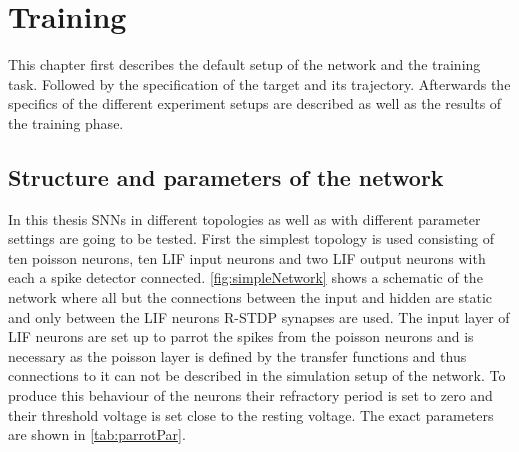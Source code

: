 
\chapter{Training}\label{chapter:Training}
This chapter first describes the default setup of the network and the training task. Followed by the specification of the target and its trajectory. Afterwards the specifics of the different experiment setups are described as well as the results of the training phase.
\section{Structure and parameters of the network}
In this thesis SNNs in different topologies as well as with different parameter settings are going to be tested. First the simplest topology is used consisting of ten poisson neurons, ten LIF input neurons and two LIF output neurons with each a spike detector connected. \autoref{fig:simpleNetwork} shows a schematic of the network where all but the connections between the input and hidden are static and only between the LIF neurons R-STDP synapses are used. The input layer of LIF neurons are set up to parrot the spikes from the poisson neurons and is necessary as the poisson layer is defined by the transfer functions and thus connections to it can not be described in the simulation setup of the network. To produce this behaviour of the neurons their refractory period is set to zero and their threshold voltage is set close to the resting voltage. The exact parameters are shown in \autoref{tab:parrotPar}.



